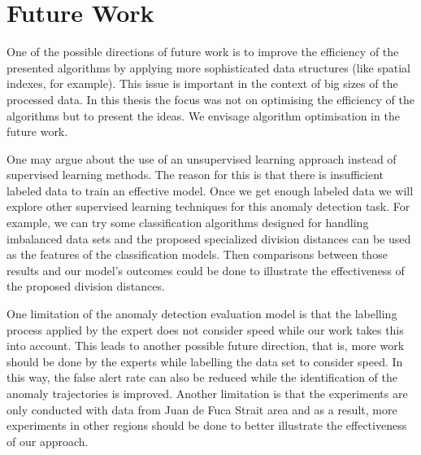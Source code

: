 \documentclass[12pt,glossary]{dalcsthesis}
\begin{document}




\section{Future Work}

One of the possible directions of future work is to improve the efficiency of the presented algorithms by applying more sophisticated data structures (like spatial indexes, for example). This issue is important in the context of big sizes of the processed data. In this thesis the focus was not on optimising the efficiency of the algorithms but to present the ideas. We envisage algorithm optimisation in the future work.

One may argue about the use of an unsupervised learning approach instead of supervised learning methods. The reason for this is that there is  insufficient labeled data to train an effective model. Once we get enough labeled data we will explore other supervised learning techniques for this anomaly detection task. For example, we can try some classification algorithms designed for handling imbalanced data sets and the proposed specialized division distances can be used as the features of the classification models.  Then comparisons between those results and our model's outcomes could be done to illustrate the effectiveness of the proposed division distances.

One limitation of the  anomaly detection evaluation model is that the labelling process applied by the expert does not consider speed while our work takes this into account. This leads to another possible future direction, that is, more work should be done by the experts while labelling the data set to consider speed. In this way, the false alert rate can also be reduced while the identification of the anomaly trajectories is improved. Another limitation is that the experiments are only conducted with data from Juan de Fuca Strait area and as a result, more experiments in other regions should be done to better illustrate the effectiveness of our approach.
\end{document}
